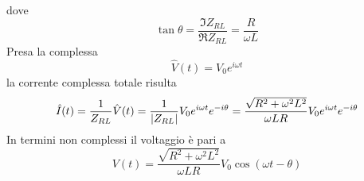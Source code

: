 dove
\begin{equation*}
	\tan\theta=\frac{\Im Z_{RL}}{\Re Z_{RL}}=\frac{R}{\omega L}
\end{equation*}
Presa la \ddp complessa
\begin{equation*}
	\hat{V}(t)=V_0e^{i\omega t}
\end{equation*}
la corrente complessa totale risulta
\begin{equation*}
	\hat{I}(t)=\frac{1}{Z_{RL}}\hat{V}(t)=\frac{1}{\abs{Z_{RL}}}V_0e^{i\omega t}e^{-i\theta}=\frac{\sqrt{R^2+\omega^2L^2}}{\omega L R}V_0e^{i\omega t}e^{-i\theta}
\end{equation*}
In termini non complessi il voltaggio è pari a
\begin{equation*}
	V(t)=\frac{\sqrt{R^2+\omega^2L^2}}{\omega L R}V_0\cos(\omega t -\theta)
\end{equation*}
